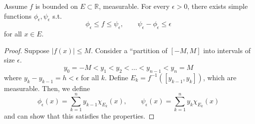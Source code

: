   \begin{lemma}
    Assume $f$ is bounded on $E \subset \mathbb{R}$, measurable. For every $\epsilon > 0$, there exists simple functions $\phi_\epsilon, \psi_\epsilon$ s.t. 
    \begin{equation}
      \phi_\epsilon \leq f \leq \psi_\epsilon, \qquad \psi_\epsilon - \phi_\epsilon \leq \epsilon
    \end{equation}
    for all $x \in E$. 
  \end{lemma}
  \begin{proof}
    Suppose $|f(x)| \leq M$. Consider a ``partition of $[-M, M]$ into intervals of size $\epsilon$. 
    \begin{equation}
      y_0 = -M < y_1 < y_2 < \ldots < y_{n-1} < y_n = M
    \end{equation}
    where $y_k - y_{k-1} = h < \epsilon$ for all $k$. Define $E_k = f^{-1} ([y_{k-1}, y_k])$, which are measurable. Then, we define 
    \begin{equation}
      \phi_\epsilon(x) = \sum_{k=1}^n y_{k-1} \chi_{E_k} (x) , \qquad \psi_\epsilon (x) = \sum_{k=1}^n y_k \chi_{E_k} (x) 
    \end{equation}
    and can show that this satisfies the properties. 
  \end{proof}

